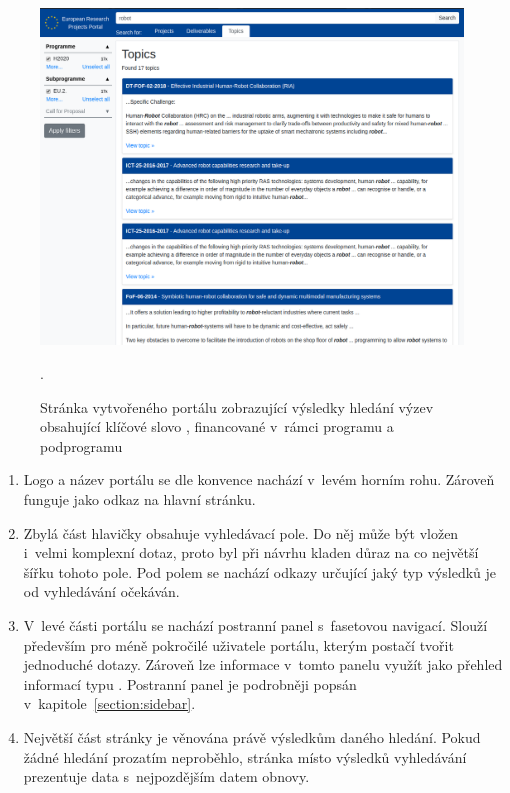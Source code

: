 \begin{figure}[H]
	\centering
	\includegraphics[width=\textwidth]{obrazky-figures/my-results.png}
	\caption{Stránka vytvořeného portálu zobrazující výsledky hledání výzev obsahující klíčové slovo , financované v~rámci programu  a podprogramu }.
	\label{image:portal-results}
\end{figure}
\begin{enumerate}
    \item Logo a název portálu se dle konvence nachází v~levém horním rohu. Zároveň funguje jako odkaz na hlavní stránku.
    \item Zbylá část hlavičky obsahuje vyhledávací pole. Do něj může být vložen i~velmi komplexní dotaz, proto byl při návrhu kladen důraz na co největší šířku tohoto pole. Pod polem se nachází odkazy určující jaký typ výsledků je od vyhledávání očekáván.
    \item V~levé části portálu se nachází postranní panel s~fasetovou navigací. Slouží především pro méně pokročilé uživatele portálu, kterým postačí tvořit jednoduché dotazy. Zároveň lze informace v~tomto panelu využít jako přehled informací typu . Postranní panel je podrobněji popsán v~kapitole~\ref{section:sidebar}.
    \item Největší část stránky je věnována právě výsledkům daného hledání. Pokud žádné hledání prozatím neproběhlo, stránka místo výsledků vyhledávání prezentuje data s~nejpozdějším datem obnovy.
\end{enumerate}



